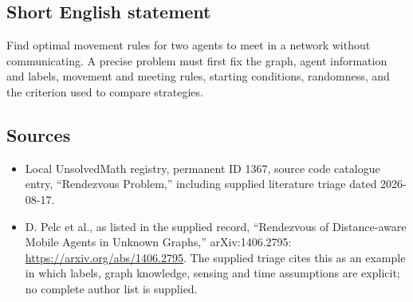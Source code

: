 \documentclass[11pt]{article}
\begin{document}
\subsection{Short English statement}
Find optimal movement rules for two agents to meet in a network without communicating. A precise problem must first fix the graph, agent information and labels, movement and meeting rules, starting conditions, randomness, and the criterion used to compare strategies.
\subsection{Sources}
\begin{itemize}
\item Local UnsolvedMath registry, permanent ID 1367, source code catalogue entry, ``Rendezvous Problem,'' including supplied literature triage dated 2026-08-17.
\item D. Pelc et al., as listed in the supplied record, ``Rendezvous of Distance-aware Mobile Agents in Unknown Graphs,'' arXiv:1406.2795: \url{https://arxiv.org/abs/1406.2795}. The supplied triage cites this as an example in which labels, graph knowledge, sensing and time assumptions are explicit; no complete author list is supplied.
\end{itemize}
\end{document}
